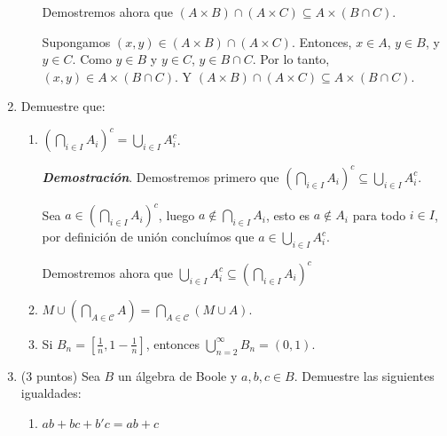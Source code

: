 \documentclass{report}
\begin{document}
\begin{enumerate}
\begin{enumerate}
            Demostremos ahora que $ (A \times B) \cap (A \times C)  \subseteq A \times (B \cap C)$.

            Supongamos $(x, y) \in (A \times B) \cap (A \times C)$. Entonces, $x \in A$, $y \in B$, y $y \in C$. Como $y \in B$ y $y \in C$, $y \in B \cap C$. Por lo tanto, $(x, y) \in A \times (B \cap C)$. Y $ (A \times B) \cap (A \times C)  \subseteq A \times (B \cap C)$.
        \end{enumerate}

        \item Demuestre que:

        \begin{enumerate}
            \item $\left(\bigcap_{i \in I} A_{i}\right)^c = \bigcup_{i \in I} A_{i}^c$.

            \textit{\textbf{Demostración}}. Demostremos primero que $\left(\bigcap_{i \in I} A_{i}\right)^c \subseteq \bigcup_{i \in I} A_{i}^c$.

            Sea $a \in \left(\bigcap_{i \in I} A_{i}\right)^c$, luego $a \not \in \bigcap_{i \in I} A_{i}$, esto es $a \not \in A_i$ para todo $i \in I$, por definición de unión concluímos que $a \in \bigcup_{i \in I} A_{i}^c$.

            Demostremos ahora que $\bigcup_{i \in I} A_{i}^c \subseteq \left(\bigcap_{i \in I} A_{i}\right)^c$

            \item $M \cup \left(\bigcap_{A \in \mathcal{C}} A\right) = \bigcap_{A \in \mathcal{C}} (M \cup A)$.
            \item Si $B_{n} = \left[\frac{1}{n}, 1 - \frac{1}{n}\right]$, entonces $\bigcup_{n=2}^{\infty} B_{n} = (0, 1)$.
        \end{enumerate}

        \item (3 puntos) Sea $B$ un álgebra de Boole y $a, b, c \in B$. Demuestre las siguientes igualdades:

        \begin{enumerate}
            \item $ab + bc + b'c = ab + c$


\end{enumerate}
\end{enumerate}
\end{document}
